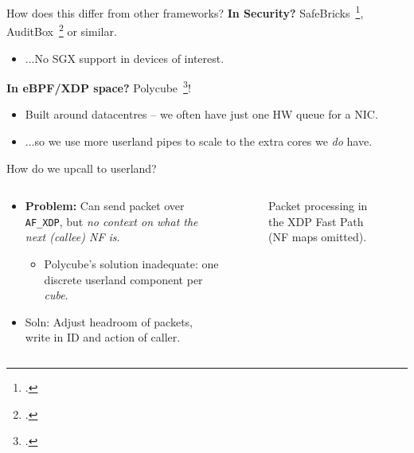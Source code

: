 \documentclass[aspectratio=169,xcolor={dvipsnames}
]{beamer}
\begin{document}
\begin{frame}{How does this differ from other frameworks?}
	\textbf{In Security?} SafeBricks~\footcite{DBLP:conf/nsdi/PoddarLPR18}, AuditBox~\footcite{DBLP:conf/nsdi/LiuSKPSS21} or similar.
	\begin{itemize}
		\item ...No SGX support in devices of interest.
	\end{itemize}
	
	\textbf{In eBPF/XDP space?} Polycube~\footcite{DBLP:journals/tnsm/MianoRBBL21}!
	\begin{itemize}
		\item Built around datacentres -- we often have just one HW queue for a NIC.
		\item \alert{...so we use more userland pipes to scale to the extra cores we \emph{do} have.}
	\end{itemize}
\end{frame}

\begin{frame}{How do we upcall to userland?}
	\begin{columns}
		\begin{column}{0.5\linewidth}
			\begin{itemize}
				\item \textbf{Problem:} Can send packet over \texttt{AF\_XDP}, but \emph{no context on what the next (callee) NF is}.
				\begin{itemize}
					\item Polycube's solution inadequate: one discrete userland component per \emph{cube}.
				\end{itemize}
				\item \alert{Soln:} Adjust headroom of packets, write in ID and action of caller.
				
			\end{itemize}
		\end{column}
		\begin{column}{0.5\linewidth}
			\begin{figure}
				\centering
				\resizebox{0.9\linewidth}{!}{}
				\caption{Packet processing in the XDP Fast Path (NF maps omitted).\label{fig:dplane-xdp}}
			\end{figure}
		\end{column}
	\end{columns}
\end{frame}
\end{document}
